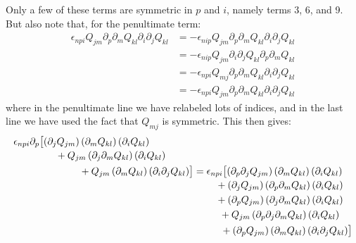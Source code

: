 \documentclass[reqno]{article}
\begin{document}
Only a few of these terms are symmetric in $p$ and $i$, namely terms 3, 6, and 9. But also note that, for the penultimate term:
\begin{equation}
\begin{split}
	\epsilon_{npi} Q_{jm} \partial_p \partial_m Q_{kl} \partial_i \partial_j Q_{kl}
	&= -\epsilon_{nip} Q_{jm} \partial_p \partial_m Q_{kl} \partial_i \partial_j Q_{kl} \\
	&= -\epsilon_{nip} Q_{jm} \partial_i \partial_j Q_{kl} \partial_p \partial_m Q_{kl} \\
	&= -\epsilon_{npi} Q_{mj} \partial_p \partial_m Q_{kl} \partial_i \partial_j Q_{kl} \\
	&= -\epsilon_{npi} Q_{jm} \partial_p \partial_m Q_{kl} \partial_i \partial_j Q_{kl}
\end{split}
\end{equation}
where in the penultimate line we have relabeled lots of indices, and in the last line we have used the fact that $Q_{mj}$ is symmetric.
This then gives:
\begin{equation}
\begin{multlined}[b]
	\epsilon_{npi} \partial_p \bigl[
	\left( \partial_j Q_{jm} \right) \left( \partial_m Q_{kl} \right) \left( \partial_i Q_{kl} \right) \\
	\hspace{0.5cm}+ Q_{jm} \left( \partial_j \partial_m Q_{kl} \right) \left( \partial_i Q_{kl} \right) \\
	\hspace{2cm}+ Q_{jm} \left( \partial_m Q_{kl} \right) \left( \partial_i \partial_j Q_{kl} \right)
	\bigr]
\end{multlined}
= 
\begin{multlined}[t]
	\epsilon_{npi} \bigl[ 
	\left( \partial_p \partial_j Q_{jm} \right) \left( \partial_m Q_{kl} \right) \left( \partial_i Q_{kl} \right) \\
	+ \left( \partial_j Q_{jm} \right) \left( \partial_p \partial_m Q_{kl} \right) \left( \partial_i Q_{kl} \right) \\
	+ \left( \partial_p Q_{jm} \right) \left( \partial_j \partial_m Q_{kl} \right) \left( \partial_i Q_{kl} \right) \\
	+ Q_{jm} \left( \partial_p \partial_j \partial_m Q_{kl} \right) \left( \partial_i Q_{kl} \right) \\
	+ \left( \partial_p Q_{jm} \right) \left( \partial_m Q_{kl} \right) \left( \partial_i \partial_j Q_{kl} \right)
	\bigr]
\end{multlined}
\end{equation}
\end{document}

